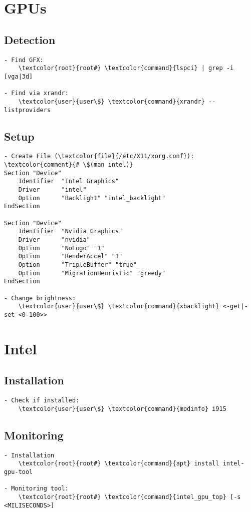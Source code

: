\documentclass[10pt, a4paper, onecolumn, openany]{book} %
\begin{document}
\section{GPUs}
\subsection{Detection}
\begin{Verbatim}[commandchars=\\\{\}]
- Find GFX:
    \textcolor{root}{root#} \textcolor{command}{lspci} | grep -i [vga|3d]
    
- Find via xrandr:
    \textcolor{user}{user\$} \textcolor{command}{xrandr} --listproviders
\end{Verbatim}
\subsection{Setup}
\begin{Verbatim}[commandchars=\\\{\}]
- Create File (\textcolor{file}{/etc/X11/xorg.conf}):
\textcolor{comment}{# \$(man intel)}
Section "Device"
    Identifier  "Intel Graphics"
    Driver      "intel"
    Option      "Backlight" "intel_backlight"
EndSection

Section "Device"
    Identifier  "Nvidia Graphics"
    Driver      "nvidia"
    Option      "NoLogo" "1"
    Option      "RenderAccel" "1"
    Option      "TripleBuffer" "true"
    Option      "MigrationHeuristic" "greedy"
EndSection

- Change brightness:
    \textcolor{user}{user\$} \textcolor{command}{xbacklight} <-get|-set <0-100>>
\end{Verbatim}

\section{Intel}
\subsection{Installation}
\begin{Verbatim}[commandchars=\\\{\}]
- Check if installed:
    \textcolor{user}{user\$} \textcolor{command}{modinfo} i915
\end{Verbatim}

\subsection{Monitoring}
\begin{Verbatim}[commandchars=\\\{\}]
- Installation
    \textcolor{root}{root#} \textcolor{command}{apt} install intel-gpu-tool
    
- Monitoring tool:
    \textcolor{root}{root#} \textcolor{command}{intel_gpu_top} [-s <MILISECONDS>]
\end{Verbatim}
\end{document}
